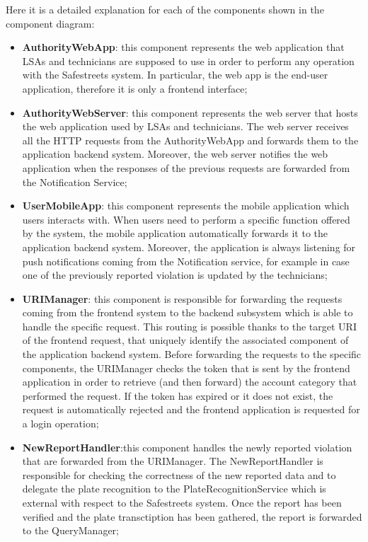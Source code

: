 Here it is a detailed explanation for each of the components shown in the component diagram:
\begin{itemize}%
    \item \textbf{AuthorityWebApp}: this component represents the web application that LSAs and technicians are supposed to use in order to perform any operation with the Safestreets system. In particular, the web app is the end-user application, therefore it is only a frontend interface;
    \item \textbf{AuthorityWebServer}: this component represents the web server that hosts the web application used by LSAs and technicians. The web server receives all the HTTP requests from the AuthorityWebApp and forwards them to the application backend system. Moreover, the web server notifies the web application when the responses of the previous requests are forwarded from the Notification Service;
    \item \textbf{UserMobileApp}: this component represents the mobile application which users interacts with. When users need to perform a specific function offered by the system, the mobile application automatically forwards it to the application backend system. Moreover, the application is always listening for push notifications coming from the Notification service, for example in case one of the previously reported violation is updated by the technicians;
    \item \textbf{URIManager}: this component is responsible for forwarding the requests coming from the frontend system to the backend subsystem which is able to handle the specific request. This routing is possible thanks to the target URI of the frontend request, that uniquely identify the associated component of the application backend system. Before forwarding the requests to the specific components, the URIManager checks the token that is sent by the frontend application in order to retrieve (and then forward) the account category that performed the request. If the token has expired or it does not exist, the request is automatically rejected and the frontend application is requested for a login operation;
    \item \textbf{NewReportHandler}:this component handles the newly reported violation that are forwarded from the URIManager. The NewReportHandler is responsible for checking the correctness of the new reported data and to delegate the plate recognition to the PlateRecognitionService which is external with respect to the Safestreets system. Once the report has been verified and the plate transctiption has been gathered, the report is forwarded to the QueryManager;

\end{itemize}
